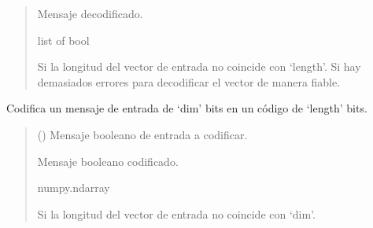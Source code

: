 \documentclass[letterpaper,10pt,english]{sphinxmanual}
\begin{document}
\begin{fulllineitems}
\begin{fulllineitems}
\begin{quote}
\begin{description}
\sphinxAtStartPar
Mensaje decodificado.

\sphinxAtStartPar
list of bool

\sphinxAtStartPar
{} \textendash{} Si la longitud del vector de entrada no coincide con ‘length’.
    Si hay demasiados errores para decodificar el vector de manera fiable.

\end{description}\end{quote}

\end{fulllineitems}


\begin{fulllineitems}
\label{\detokenize{myutils:myutils.bool.LinearSystECC.encode}}
\pysigstartsignatures
{}
\pysigstopsignatures
\sphinxAtStartPar
Codifica un mensaje de entrada de ‘dim’ bits en un código de ‘length’ bits.
\begin{quote}\begin{description}
\sphinxAtStartPar
{} () \textendash{} Mensaje booleano de entrada a codificar.

\sphinxAtStartPar
Mensaje booleano codificado.

\sphinxAtStartPar
numpy.ndarray

\sphinxAtStartPar
{} \textendash{} Si la longitud del vector de entrada no coincide con ‘dim’.

\end{description}\end{quote}

\end{fulllineitems}


\end{fulllineitems}

\end{document}
